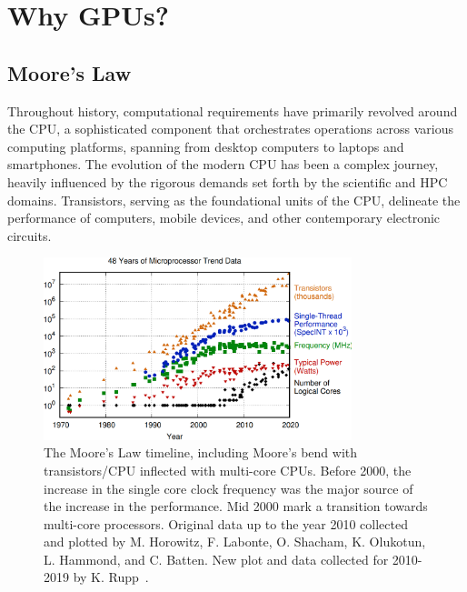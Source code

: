 \section{Why GPUs?}


\subsection{Moore’s Law}


\par
Throughout history, computational requirements have primarily revolved around the CPU, a sophisticated component that orchestrates operations across various computing platforms, spanning from desktop computers to laptops and smartphones. The evolution of the modern CPU has been a complex journey, heavily influenced by the rigorous demands set forth by the scientific and HPC domains. Transistors, serving as the foundational units of the CPU, delineate the performance of computers, mobile devices, and other contemporary electronic circuits.

\begin{figure}[!h]
\centering\includegraphics[width=0.8\textwidth]{fig_logo_history/microprocessor_trend.png}
\caption{The Moore’s Law timeline, including Moore's bend with transistors/CPU inflected with multi-core CPUs. Before 2000, the increase in the single core clock frequency was the major source of the increase in the performance. Mid 2000 mark a transition towards multi-core processors. Original data up to the year 2010 collected and plotted by M. Horowitz, F. Labonte, O. Shacham, K. Olukotun, L. Hammond, and C. Batten. New plot and data collected for 2010-2019 by K. Rupp~\cite{microprocessor-trend-data}.}\label{fig:microprocessor_trend}
\end{figure}


\par


